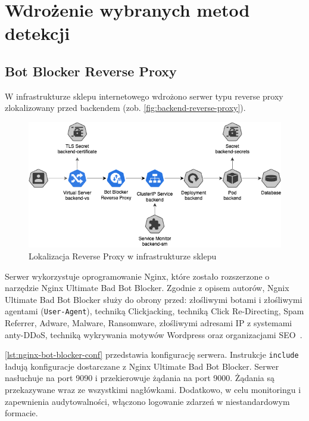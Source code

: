 \newpage


\section{Wdrożenie wybranych metod detekcji}\label{sec:wdrozenie-metod-detekcji}

\subsection{Bot Blocker Reverse Proxy}\label{subsec:reverse-proxy-impl}

W infrastrukturze sklepu internetowego wdrożono serwer typu reverse proxy zlokalizowany przed backendem (zob. \autoref{fig:backend-reverse-proxy}).

\begin{figure}[H]
    \centering
    \captionsetup{width=.8\linewidth}
    \includegraphics[width=\textwidth]{img/backend-reverse-proxy}
    \caption{Lokalizacja Reverse Proxy w infrastrukturze sklepu}
    \label{fig:backend-reverse-proxy}
\end{figure}

Serwer wykorzystuje oprogramowanie Nginx, które zostało rozszerzone o narzędzie Nginx Ultimate Bad Bot Blocker.
Zgodnie z opisem autorów, Ngnix Ultimate Bad Bot Blocker służy do obrony przed:
złośliwymi botami i złośliwymi agentami (\texttt{User-Agent}),
techniką Clickjacking, techniką Click Re-Directing,
Spam Referrer, Adware, Malware, Ransomware,
złośliwymi adresami IP z systemami anty-DDoS,
techniką wykrywania motywów Wordpress
oraz organizacjami SEO~\cite{nginx-ultimate-bad-bot-blocker}.

\autoref{lst:nginx-bot-blocker-conf} przedstawia konfigurację serwera.
Instrukcje \texttt{include} ładują konfiguracje dostarczane z Nginx Ultimate Bad Bot Blocker.
Serwer nasłuchuje na port 9090 i przekierowuje żądania na port 9000.
Żądania są przekazywane wraz ze wszystkimi nagłówkami.
Dodatkowo, w celu monitoringu i zapewnienia audytowalności, włączono logowanie zdarzeń w niestandardowym formacie.

